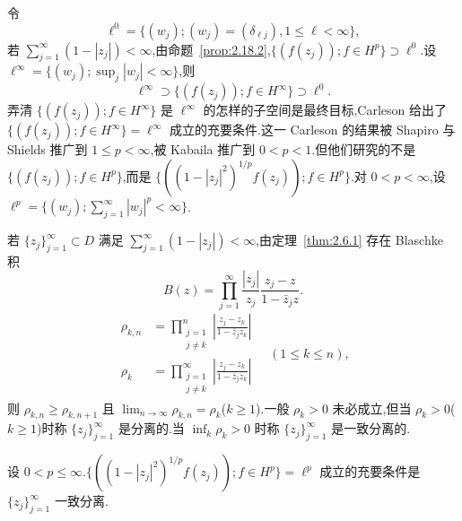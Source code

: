 令
\begin{equation*}
\ell^{0} = \{(w_{j}); (w_{j}) = (\delta_{\ell j}), 1 \leq \ell < \infty\},
\end{equation*}
若 $\sum_{j=1}^{\infty}(1 - |z_{j}|) < \infty$,由命题~\ref{prop:2.18.2},$\{(f(z_{j})); f \in H^{p}\} \supset \ell^{0}$.设 $\ell^{\infty} = \{(w_{j}); \sup_{j}|w_{j}| < \infty\}$,则
\begin{equation*}
\ell^{\infty} \supset \{(f(z_{j})); f \in H^{\infty}\} \supset \ell^{0}.
\end{equation*}
弄清 $\{(f(z_{j})); f \in H^{\infty}\}$ 是 $\ell^{\infty}$ 的怎样的子空间是最终目标,Carleson \cite{ch2:16} 给出了 $\{(f(z_{j})); f \in H^{\infty}\} = \ell^{\infty}$ 成立的充要条件.这一 Carleson 的结果被 Shapiro 与 Shields \cite{ch2:17} 推广到 $1 \leq p < \infty$,被 Kabaila \cite{ch2:18} 推广到 $0 < p < 1$.但他们研究的不是 $\{(f(z_{j})); f \in H^{p}\}$,而是 $\{((1 - |z_{j}|^{2})^{1/p}f(z_{j})); f \in H^{p}\}$.对 $0 < p < \infty$,设 $\ell^{p} = \{(w_{j}); \sum_{j=1}^{\infty}|w_{j}|^{p} < \infty\}$.

若 $\{z_{j}\}_{j=1}^{\infty} \subset D$ 满足 $\sum_{j=1}^{\infty}(1 - |z_{j}|) < \infty$,由定理~\ref{thm:2.6.1} 存在 Blaschke 积
\begin{equation*}
B(z) = \prod_{j=1}^{\infty} \frac{|z_{j}|}{z_{j}}\frac{z_{j} - z}{1 - \bar{z}_{j}z}.
\end{equation*}
\begin{equation*}
\begin{aligned}
\rho_{k,n} &= \prod_{\substack{j=1\\ j\neq k}}^{n}\left|\frac{z_{j} - z_{k}}{1 - \bar{z}_{j}z_{k}}\right|\\
\rho_{k} &= \prod_{\substack{j=1\\ j\neq k}}^{\infty}\left|\frac{z_{j} - z_{k}}{1 - \bar{z}_{j}z_{k}}\right|
\end{aligned} \quad (1 \leq k \leq n),
\end{equation*}
则 $\rho_{k,n} \geq \rho_{k,n+1}$ 且 $\lim_{n \to \infty}\rho_{k,n} = \rho_{k}$($k \geq 1$).一般 $\rho_{k} > 0$ 未必成立,但当 $\rho_{k} > 0$($k \geq 1$)时称 $\{z_{j}\}_{j=1}^{\infty}$ 是分离的.当 $\inf_{k}\rho_{k} > 0$ 时称 $\{z_{j}\}_{j=1}^{\infty}$ 是一致分离的.

\begin{theorem}\label{thm:2.18.3}
设 $0 < p \leq \infty$.$\{((1 - |z_{j}|^{2})^{1/p}f(z_{j})); f \in H^{p}\} = \ell^{p}$ 成立的充要条件是 $\{z_{j}\}_{j=1}^{\infty}$ 一致分离.
\end{theorem}

